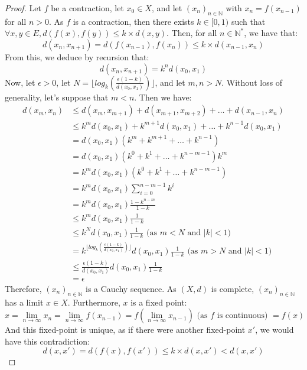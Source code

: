 \documentclass{article}
\theoremstyle{definition}
\theoremstyle{remark}
\theoremstyle{example}
\begin{document}
\begin{proof}
    Let $f$ be a contraction, let $x_0 \in X$, and let $(x_n)_{n \in \mathbb{N}}$ with $x_n = f(x_{n-1})$ for all $n>0$. As $f$ is a contraction, then there exists $k \in [0, 1)$ such that $\forall x, y \in E, d(f(x), f(y)) \leq k \times d(x, y)$. Then, for all $n \in \mathbb{N}^*$, we have that:
        $$d(x_n, x_{n+1}) = d(f(x_{n-1}), f(x_n)) \leq k \times d(x_{n-1}, x_n)$$
    From this, we deduce by recursion that:
        $$d(x_n, x_{n+1}) = k^n d(x_0, x_1)$$
    Now, let $\epsilon > 0$, let $N = \lfloor log_k(\frac{\epsilon(1 - k)}{d(x_0, x_1)}) \rfloor$, and let $m, n > N$. Without loss of generality, let's suppose that $m < n$. Then we have:
    \begin{align*}
        d(x_m, x_n) &\leq d(x_m, x_{m+1}) + d(x_{m+1}, x_{m+2}) + \dots + d(x_{n-1}, x_n)\\
        &\leq k^m d(x_0, x_1) + k^{m+1} d(x_0, x_1) + \dots + k^{n-1} d(x_0, x_1)\\
        &= d(x_0, x_1) (k^m + k^{m+1} + \dots + k^{n-1})\\
        &= d(x_0, x_1) (k^0 + k^1 + \dots + k^{n-m-1}) k^m\\
        &= k^m d(x_0, x_1) (k^0 + k^1 + \dots + k^{n-m-1})\\
        &= k^m d(x_0, x_1) \sum_{i=0}^{n-m-1} k^i\\
        &= k^m d(x_0, x_1) \frac{1 - k^{n-m}}{1 - k}\\
        &\leq k^m d(x_0, x_1) \frac{1}{1 - k}\\
        &\leq k^N d(x_0, x_1) \frac{1}{1 - k} \text{ (as $m<N$ and $|k|<1$)}\\
        &= k^{\lfloor log_k(\frac{\epsilon(1 - k)}{d(x_0, x_1)}) \rfloor} d(x_0, x_1) \frac{1}{1 - k} \text{ (as $m>N$ and $|k|<1$)}\\
        &\leq \frac{\epsilon(1 - k)}{d(x_0, x_1)} d(x_0, x_1) \frac{1}{1 - k}\\
        &= \epsilon
    \end{align*}
    Therefore, $(x_n)_{n \in \mathbb{N}}$ is a Cauchy sequence. As $(X, d)$ is complete, $(x_n)_{n \in \mathbb{N}}$ has a limit $x \in X$. Furthermore, $x$ is a fixed point:
	$$x = \lim_{n \rightarrow \infty} x_n = \lim_{n \rightarrow \infty} f(x_{n-1}) = f(\lim_{n \rightarrow \infty} x_{n-1}) \text{ (as $f$ is continuous) } = f(x)$$
    And this fixed-point is unique, as if there were another fixed-point $x'$, we would have this contradiction:
        $$d(x, x') = d(f(x), f(x'))  \leq k \times d(x, x') < d(x, x')$$
\end{proof}
\end{document}

